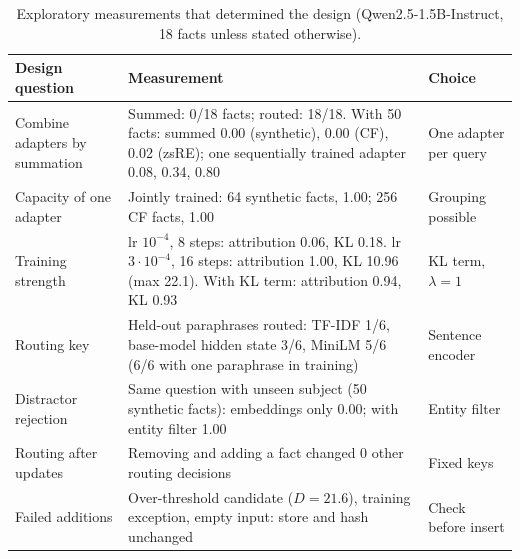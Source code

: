 \begin{table}[t]
\centering
\caption{Exploratory measurements that determined the design
(Qwen2.5-1.5B-Instruct, 18 facts unless stated otherwise).}
\label{tab:lessons}
\scriptsize
\setlength{\tabcolsep}{3pt}
\begin{tabular}{>{\raggedright\arraybackslash}p{1.9cm}>{\raggedright\arraybackslash}p{3.9cm}>{\raggedright\arraybackslash}p{1.8cm}}
\toprule
Design question & Measurement & Choice \\
\midrule
Combine adapters by summation & Summed: 0/18 facts; routed: 18/18. With 50 facts: summed 0.00 (synthetic), 0.00 (CF), 0.02 (zsRE); one sequentially trained adapter 0.08, 0.34, 0.80 & One adapter per query \\
\addlinespace
Capacity of one adapter & Jointly trained: 64 synthetic facts, 1.00; 256 CF facts, 1.00 & Grouping possible \\
\addlinespace
Training strength & lr $10^{-4}$, 8 steps: attribution 0.06, KL 0.18. lr $3{\cdot}10^{-4}$, 16 steps: attribution 1.00, KL 10.96 (max 22.1). With KL term: attribution 0.94, KL 0.93 & KL term, $\lambda=1$ \\
\addlinespace
Routing key & Held-out paraphrases routed: TF-IDF 1/6, base-model hidden state 3/6, MiniLM 5/6 (6/6 with one paraphrase in training) & Sentence encoder \\
\addlinespace
Distractor rejection & Same question with unseen subject (50 synthetic facts): embeddings only 0.00; with entity filter 1.00 & Entity filter \\
\addlinespace
Routing after updates & Removing and adding a fact changed 0 other routing decisions & Fixed keys \\
\addlinespace
Failed additions & Over-threshold candidate ($D=21.6$), training exception, empty input: store and hash unchanged & Check before insert \\
\bottomrule
\end{tabular}
\end{table}
